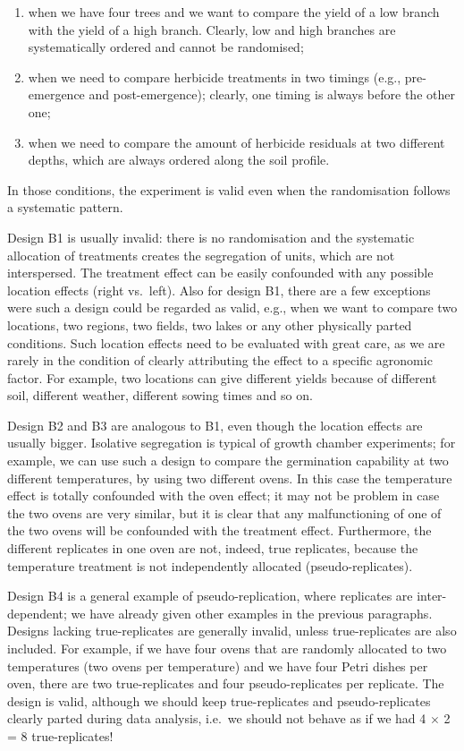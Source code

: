 \documentclass[a4paper,12pt,oneside]{book}
\providecommand{\tightlist}{%
  \setlength{\itemsep}{0pt}\setlength{\parskip}{0pt}}
\begin{document}
\begin{enumerate}
\def\labelenumi{\arabic{enumi}.}
\tightlist
\item
  when we have four trees and we want to compare the yield of a low branch with the yield of a high branch. Clearly, low and high branches are systematically ordered and cannot be randomised;
\item
  when we need to compare herbicide treatments in two timings (e.g., pre-emergence and post-emergence); clearly, one timing is always before the other one;
\item
  when we need to compare the amount of herbicide residuals at two different depths, which are always ordered along the soil profile.
\end{enumerate}

In those conditions, the experiment is valid even when the randomisation follows a systematic pattern.

Design B1 is usually invalid: there is no randomisation and the systematic allocation of treatments creates the segregation of units, which are not interspersed. The treatment effect can be easily confounded with any possible location effects (right vs.~left). Also for design B1, there are a few exceptions were such a design could be regarded as valid, e.g., when we want to compare two locations, two regions, two fields, two lakes or any other physically parted conditions. Such location effects need to be evaluated with great care, as we are rarely in the condition of clearly attributing the effect to a specific agronomic factor. For example, two locations can give different yields because of different soil, different weather, different sowing times and so on.

Design B2 and B3 are analogous to B1, even though the location effects are usually bigger. Isolative segregation is typical of growth chamber experiments; for example, we can use such a design to compare the germination capability at two different temperatures, by using two different ovens. In this case the temperature effect is totally confounded with the oven effect; it may not be problem in case the two ovens are very similar, but it is clear that any malfunctioning of one of the two ovens will be confounded with the treatment effect. Furthermore, the different replicates in one oven are not, indeed, true replicates, because the temperature treatment is not independently allocated (pseudo-replicates).

Design B4 is a general example of pseudo-replication, where replicates are inter-dependent; we have already given other examples in the previous paragraphs. Designs lacking true-replicates are generally invalid, unless true-replicates are also included. For example, if we have four ovens that are randomly allocated to two temperatures (two ovens per temperature) and we have four Petri dishes per oven, there are two true-replicates and four pseudo-replicates per replicate. The design is valid, although we should keep true-replicates and pseudo-replicates clearly parted during data analysis, i.e.~we should not behave as if we had 4 \(\times\) 2 = 8 true-replicates!
\end{document}
